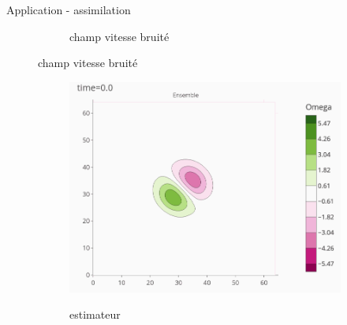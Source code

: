 \documentclass[aspectratio=169]{beamer} %
\begin{document}
\begin{frame}{Application - assimilation}
\begin{figure}[t]
\begin{subfigure}{0.3\textwidth}
            \caption*{\tiny champ vitesse bruité}
        \end{subfigure}
    \end{figure}
    \begin{figure}[t]
        \begin{subfigure}{0.3\textwidth}
            \centering
            {\includegraphics[height=0.3\textheight]{../../conference/images/dipole_estimate/estimate/estimate-0.png}}
            \caption*{\tiny estimateur}
        \end{subfigure}
        \begin{subfigure}{0.3\textwidth}
            \centering

\end{subfigure}
\end{figure}
\end{frame}
\end{document}
